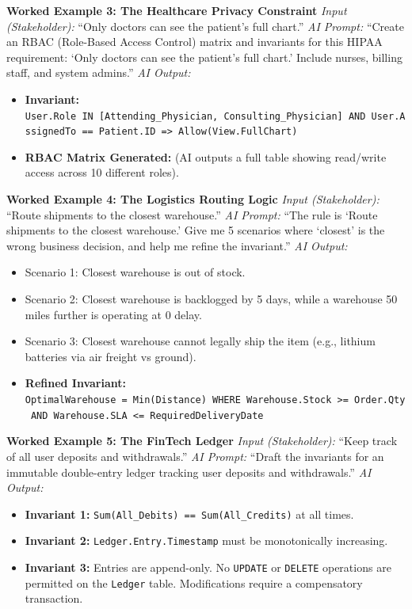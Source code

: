 \documentclass[
  11pt,
  openany,
  oneside]{book}
\providecommand{\tightlist}{%
  \setlength{\itemsep}{0pt}\setlength{\parskip}{0pt}}
\begin{document}
\textbf{Worked Example 3: The Healthcare Privacy Constraint} \emph{Input
(Stakeholder):} ``Only doctors can see the patient's full chart.''
\emph{AI Prompt:} ``Create an RBAC (Role-Based Access Control) matrix
and invariants for this HIPAA requirement: `Only doctors can see the
patient's full chart.' Include nurses, billing staff, and system
admins.'' \emph{AI Output:}

\begin{itemize}
\tightlist
\item
  \textbf{Invariant:}
  \texttt{User.Role\ IN\ {[}Attending\_Physician,\ Consulting\_Physician{]}\ AND\ User.AssignedTo\ ==\ Patient.ID\ =\textgreater{}\ Allow(View.FullChart)}
\item
  \textbf{RBAC Matrix Generated:} (AI outputs a full table showing
  read/write access across 10 different roles).
\end{itemize}

\textbf{Worked Example 4: The Logistics Routing Logic} \emph{Input
(Stakeholder):} ``Route shipments to the closest warehouse.'' \emph{AI
Prompt:} ``The rule is `Route shipments to the closest warehouse.' Give
me 5 scenarios where `closest' is the wrong business decision, and help
me refine the invariant.'' \emph{AI Output:}

\begin{itemize}
\tightlist
\item
  Scenario 1: Closest warehouse is out of stock.
\item
  Scenario 2: Closest warehouse is backlogged by 5 days, while a
  warehouse 50 miles further is operating at 0 delay.
\item
  Scenario 3: Closest warehouse cannot legally ship the item (e.g.,
  lithium batteries via air freight vs ground).
\item
  \textbf{Refined Invariant:}
  \texttt{OptimalWarehouse\ =\ Min(Distance)\ WHERE\ Warehouse.Stock\ \textgreater{}=\ Order.Qty\ AND\ Warehouse.SLA\ \textless{}=\ RequiredDeliveryDate}
\end{itemize}

\textbf{Worked Example 5: The FinTech Ledger} \emph{Input
(Stakeholder):} ``Keep track of all user deposits and withdrawals.''
\emph{AI Prompt:} ``Draft the invariants for an immutable double-entry
ledger tracking user deposits and withdrawals.'' \emph{AI Output:}

\begin{itemize}
\tightlist
\item
  \textbf{Invariant 1:} \texttt{Sum(All\_Debits)\ ==\ Sum(All\_Credits)}
  at all times.
\item
  \textbf{Invariant 2:} \texttt{Ledger.Entry.Timestamp} must be
  monotonically increasing.
\item
  \textbf{Invariant 3:} Entries are append-only. No \texttt{UPDATE} or
  \texttt{DELETE} operations are permitted on the \texttt{Ledger} table.
  Modifications require a compensatory transaction.
\end{itemize}
\end{document}

